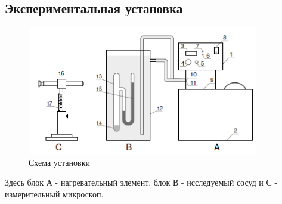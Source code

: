 \documentclass[a4paper, 12pt]{article}%
\begin{document}
\subsection*{Экспериментальная установка}
\begin{figure}[h]
\includegraphics[width = 0.9\textwidth]{1.png}
\caption{Схема установки}
\end{figure}
Здесь блок А - нагревательный элемент, блок В - исследуемый сосуд и С - измерительный микроскоп.
\end{document}
